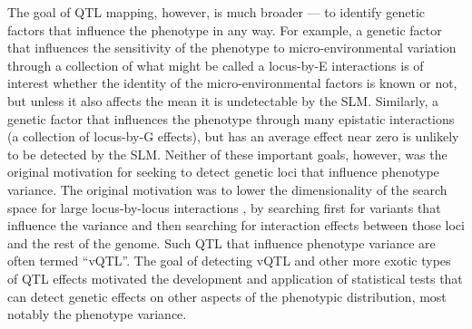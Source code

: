 
The goal of QTL mapping, however, is much broader --- to identify genetic factors that influence the phenotype in any way.
For example, a genetic factor that influences the sensitivity of the phenotype to micro-environmental variation through a collection of what might be called a locus-by-E interactions is of interest whether the identity of the micro-environmental factors is known or not, but unless it also affects the mean it is undetectable by the SLM.
Similarly, a genetic factor that influences the phenotype through many epistatic interactions (a collection of locus-by-G effects), but has an average effect near zero is unlikely to be detected by the SLM.
Neither of these important goals, however, was the original motivation for seeking to detect genetic loci that influence phenotype variance.
The original motivation was to lower the dimensionality of the search space for large locus-by-locus interactions \citep{Pare2010}, by searching first for variants that influence the variance and then searching for interaction effects between those loci and the rest of the genome.
Such QTL that influence phenotype variance are often termed ``vQTL''.
The goal of detecting vQTL and other more exotic types of QTL effects motivated the development and application of statistical tests that can detect genetic effects on other aspects of the phenotypic distribution, most notably the phenotype variance.

